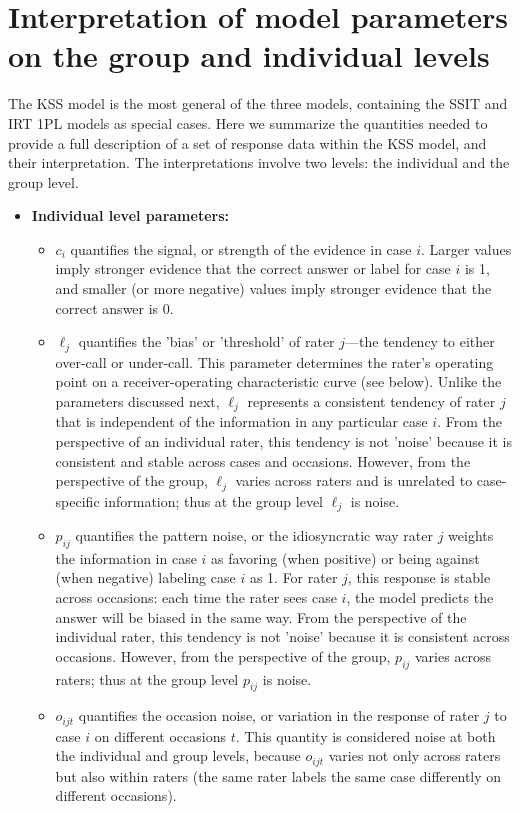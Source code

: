 \documentclass[num-refs]{wiley-article}
\begin{document}
\section*{Interpretation of model parameters on the group and individual levels}\label{section-interpretation}
The KSS model is the most general of the three models, containing the SSIT and IRT 1PL models as special cases. Here we summarize the quantities needed to provide a full description of a set of response data within the KSS model, and their interpretation. The interpretations involve two levels: the individual and the group level.

\begin{itemize}
    \item \textbf{Individual level parameters:}
    \begin{itemize}
    \item $c_i$ quantifies the signal, or strength of the evidence in case $i$. Larger values imply stronger evidence that the correct answer or label for case $i$ is 1, and smaller (or more negative) values imply stronger evidence that the correct answer is 0.
        \item $\ell_j$ quantifies the 'bias' or 'threshold' of rater $j$---the tendency to either over-call or under-call. This parameter determines the rater's operating point on a receiver-operating characteristic curve (see below). Unlike the parameters discussed next, $\ell_j$ represents a consistent tendency of rater $j$ that is independent of the information in any particular case $i$. From the perspective of an individual rater, this tendency is not 'noise' because it is consistent and stable across cases and occasions. However, from the perspective of the group, $\ell_j$ varies across raters and is unrelated to case-specific information; thus at the group level $\ell_j$ is noise.
        \item $p_{ij}$ quantifies the pattern noise, or the idiosyncratic way rater $j$ weights the information in case $i$ as favoring (when positive) or being against (when negative) labeling case $i$ as 1. For rater $j$, this response is stable across occasions: each time the rater sees case $i$, the model predicts the answer will be biased in the same way. From the perspective of the individual rater, this tendency is not 'noise' because it is consistent across occasions. However, from the perspective of the group, $p_{ij}$ varies across raters; thus at the group level $p_{ij}$ is noise.
        \item $o_{ijt}$ quantifies the occasion noise, or variation in the response of rater $j$ to case $i$ on different occasions $t$. This quantity is considered noise at both the individual and group levels, because $o_{ijt}$ varies not only across raters but also within raters (the same rater labels the same case differently on different occasions).

\end{itemize}
\end{itemize}
\end{document}
